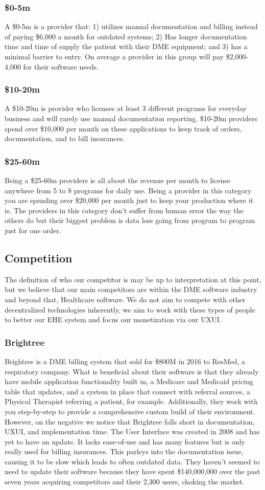 \documentclass[letterpaper]{article}
\begin{document}
  \subsubsection{\$0-5m}
  A \$0-5m is a provider that: 1) utilizes manual documentation and billing instead of paying \$6,000 a month for outdated systems; 2) Has longer documentation time and time of supply the patient with their DME equipment; and 3) has a minimal barrier to entry. On average a provider in this group will pay \$2,000-4,000 for their software needs.
%
  \subsubsection{\$10-20m}
  A \$10-20m is provider who licenses at least 3 different programs for everyday business and will rarely use manual documentation reporting. \$10-20m providers spend over \$10,000 per month on these applications to keep track of orders, documentation, and to bill insurances.
%
  \subsubsection{\$25-60m}
  Being a \$25-60m providers is all about the revenue per month to license anywhere from 5 to 8 programs for daily use. Being a provider in this category you are spending over \$20,000 per month just to keep your production where it is. The providers in this category don’t suffer from human error the way the others do but their biggest problem is data loss going from program to program just for one order.
%
\subsection{Competition}
The definition of who our competitor is may be up to interpretation at this point, but we believe that our main competitors are within the DME software industry and beyond that, Healthcare software. We do not aim to compete with other decentralized technologies inherently, we aim to work with these types of people to better our EHE system and focus our monetization via our UXUI.
%
  \subsubsection{Brightree}
  Brightree is a DME billing system that sold for \$800M in 2016 to ResMed, a respiratory company. What is beneficial about their software is that they already have mobile application functionality built in, a Medicare and Medicaid pricing table that updates, and a system in place that connect with referral sources, a Physical Therapist referring a patient, for example. Additionally, they work with you step-by-step to provide a comprehensive custom build of their environment.
%
  However, on the negative we notice that Brightree falls short in documentation, UXUI, and implementation time. The User Interface was created in 2008 and has yet to have an update. It lacks ease-of-use and has many features but is only really used for billing insurances. This parleys into the documentation issue, causing it to be slow which leads to often outdated data. They haven’t seemed to need to update their software because they have spent \$140,000,000 over the past seven years acquiring competitors and their 2,300 users, choking the market.
%
\end{document}
